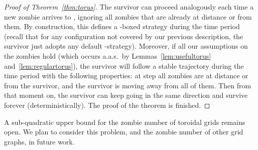 \documentclass[12pt]{amsart}
\begin{document}
\begin{proof}[Proof of Theorem~\ref{thm:torus}]
The survivor can proceed analogously each time a new zombie arrives to , ignoring all zombies that are already at distance  or  from them. By construction, this defines a -boxed strategy during the time period  (recall that for any configuration not covered by our previous description, the survivor just adopts any default -strategy). Moreover, if all our
assumptions on the zombies hold (which occurs a.a.s.~by Lemmas~\ref{lem:usefultorus} and~\ref{lem:regulartorus}), the survivor will follow a stable trajectory during the time period  with
the following properties: at step  all zombies are at distance  or  from the survivor, and the survivor is moving away from all of them. Then from that moment on, the survivor can keep
going in the same direction and survive forever (deterministically). The proof of the theorem is finished.
\end{proof}

A sub-quadratic upper bound for the zombie number of toroidal grids remains open. We plan to consider this problem, and the zombie number of other grid graphs, in future work.
\end{document}
